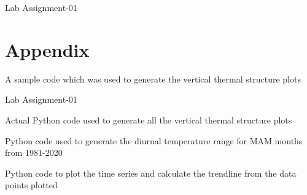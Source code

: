 \documentclass[10pt, a4paper]{article}
\begin{document}
\newpage
Lab Assignment-01


\section{Appendix}

A sample code which was used to generate the vertical thermal structure plots



\newpage
Lab Assignment-01
\vspace{1cm}

Actual Python code used to generate all the vertical thermal structure plots 


\vspace{1cm}
\hline
\vspace{1cm}

Python code used to generate the diurnal temperature range for MAM months from 1981-2020



\vspace{1cm}
Python code to plot the time series and calculate the trendline from the data points plotted




\end{document}
